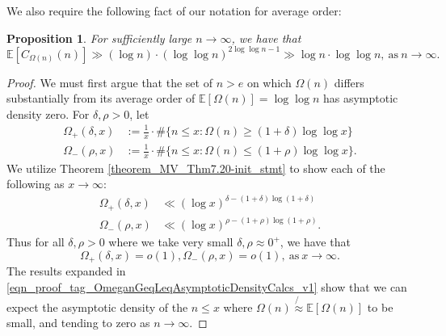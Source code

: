 \documentclass[11pt,reqno,a4letter]{article}
\numberwithin{figure}{section}
\numberwithin{table}{section}
\theoremstyle{plain}
\newtheorem{prop}[theorem]{Proposition}
\numberwithin{theorem}{section}
\theoremstyle{definition}
\begin{document}
We also require the following fact of our notation for average order: 

\begin{prop} 
\label{prop_factA_stmt_v1} 
For sufficiently large $n \rightarrow \infty$, we have that 
$$\mathbb{E}[C_{\Omega(n)}(n)] \gg (\log n) \cdot (\log\log n)^{2\log\log n - 1} \gg 
  \log n \cdot \log\log n, \mathrm{\ as\ } n \rightarrow \infty.$$
\end{prop} 
\begin{proof} 
We must first argue that the set of $n > e$ on which $\Omega(n)$ differs substantially 
from its average order of $\mathbb{E}[\Omega(n)] = \log\log n$ has asymptotic density zero. 
For $\delta, \rho > 0$, let 
\begin{align*} 
\Omega_{+}(\delta, x) & := \frac{1}{x} \cdot \#\{n \leq x: \Omega(n) \geq (1+\delta) \log\log x\} \\ 
\Omega_{-}(\rho, x) & := \frac{1}{x} \cdot \#\{n \leq x: \Omega(n) \leq (1+\rho) \log\log x\}. 
\end{align*} 
We utilize Theorem \ref{theorem_MV_Thm7.20-init_stmt} 
to show each of the following as $x \rightarrow \infty$: 
\begin{align*} 
\Omega_{+}(\delta, x) & \ll (\log x)^{\delta - (1+\delta)\log(1+\delta)} \\ 
\Omega_{-}(\rho, x) & \ll (\log x)^{\rho - (1+\rho)\log(1+\rho)}. 
\end{align*} 
Thus for all $\delta, \rho > 0$ where we take very small 
$\delta, \rho \approx 0^{+}$, we have that 
\begin{equation} 
\label{eqn_proof_tag_OmeganGeqLeqAsymptoticDensityCalcs_v1} 
\Omega_{+}(\delta, x) = o(1), \Omega_{-}(\rho, x) = o(1), \mathrm{\ as\ } x \rightarrow \infty. 
\end{equation} 
The results expanded in 
\eqref{eqn_proof_tag_OmeganGeqLeqAsymptoticDensityCalcs_v1} show that we can expect the 
asymptotic density of the $n \leq x$ where $\Omega(n) \not{\approx} \mathbb{E}[\Omega(n)]$ to be small, 
and tending to zero as $n \rightarrow \infty$. 


\end{proof}
\end{document}
